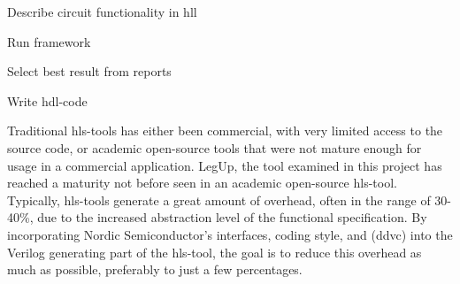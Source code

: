 \begin{compactenum}
    \item Describe circuit functionality in \gls{hll}
    \item Run framework
    \item Select best result from reports
    \item Write \gls{hdl}-code
\end{compactenum}
Traditional \gls{hls}-tools has either been commercial, with very limited access to the source code, or academic open-source tools that were not mature enough for usage in a commercial application. LegUp, the tool examined in this project has reached a maturity not before seen in an academic open-source \gls{hls}-tool. Typically, \gls{hls}-tools generate a great amount of overhead, often in the range of 30-40\%,%
due to the increased abstraction level of the functional specification. By incorporating Nordic Semiconductor's interfaces, coding style, and (\gls{ddvc}) into the Verilog generating part of the \gls{hls}-tool, the goal is to reduce this overhead as much as possible, preferably to just a few percentages.
